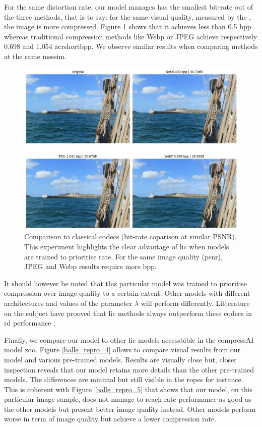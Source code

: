 For the same distortion rate, our model manages has the smallest bit-rate out of the three methods, that is to say: for the same visual quality, measured by the , the image is more compressed. Figure \ref{balle_repro_3} shows that it achieves less than 0.5 \acrshort{bpp} whereas traditional compression methods like Webp or JPEG achieve respectively 0.698 and 1.054 acrshort{bpp}. We observe similar results when comparing methods at the same \acrshort{msssim}.

\begin{figure}
    \centering
    \includegraphics[width=15cm]{img/balle_repro_3.png}
    \caption[Comparison to classical codecs (bit-rate coparison at similar PSNR).]{Comparison to classical codecs (bit-rate coparison at similar PSNR). This experiment highlights the clear advantage of \acrshort{lic} when models are trained to prioritise rate. For the same image quality (\acrshort{psnr}), JPEG and Webp results require more \acrshort{bpp}.}
    \label{balle_repro_3}
\end{figure}

It should however be noted that this particular model was trained to prioritise compression over image quality to a certain extent. Other models with different architectures and values of the parameter \(\lambda\) will perform differently. Litterature on the subject have prooved that \acrshort{lic} methods always outperform these codecs in \acrshort{rd} performance \cite{ballé2018variationalimagecompressionscale}.

Finally, we compare our model to other \acrshort{lic} models accessbible in the compressAI model zoo. Figure \ref{balle_repro_4} allows to compare visual results from our model and various pre-trained models. Results are visually close but, closer inspection reveals that our model retains more details than the other pre-trained models. The differences are minimal but still visible in the ropes for instance. This is coherent with Figure \ref{balle_repro_5} that shows that our model, on this particular image sample, does not manage to reach rate performance as good as the other models but present better image quality instead. Other models perform worse in term of image quality but achieve a lower compression rate.


